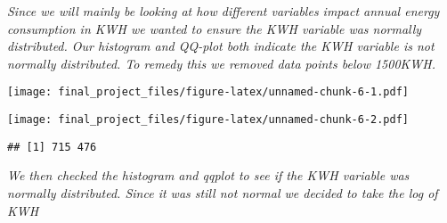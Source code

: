 \documentclass[
]{article}
\newenvironment{Shaded}{\begin{snugshade}}{\end{snugshade}}
\newcommand{\AttributeTok}[1]{\textcolor[rgb]{0.77,0.63,0.00}{#1}}
\newcommand{\CommentTok}[1]{\textcolor[rgb]{0.56,0.35,0.01}{\textit{#1}}}
\newcommand{\ConstantTok}[1]{\textcolor[rgb]{0.00,0.00,0.00}{#1}}
\newcommand{\DecValTok}[1]{\textcolor[rgb]{0.00,0.00,0.81}{#1}}
\newcommand{\FunctionTok}[1]{\textcolor[rgb]{0.00,0.00,0.00}{#1}}
\newcommand{\NormalTok}[1]{#1}
\newcommand{\OtherTok}[1]{\textcolor[rgb]{0.56,0.35,0.01}{#1}}
\newcommand{\SpecialCharTok}[1]{\textcolor[rgb]{0.00,0.00,0.00}{#1}}
\newcommand{\StringTok}[1]{\textcolor[rgb]{0.31,0.60,0.02}{#1}}
\begin{document}
\emph{Since we will mainly be looking at how different variables impact
annual energy consumption in KWH we wanted to ensure the KWH variable
was normally distributed. Our histogram and QQ-plot both indicate the
KWH variable is not normally distributed. To remedy this we removed data
points below 1500KWH.}

\begin{Shaded}
\end{Shaded}

\texttt{[image: final\_project\_files/figure-latex/unnamed-chunk-6-1.pdf]}

\begin{Shaded}
\end{Shaded}

\texttt{[image: final\_project\_files/figure-latex/unnamed-chunk-6-2.pdf]}

\begin{verbatim}
## [1] 715 476
\end{verbatim}

\emph{We then checked the histogram and qqplot to see if the KWH
variable was normally distributed. Since it was still not normal we
decided to take the log of KWH}
\end{document}
